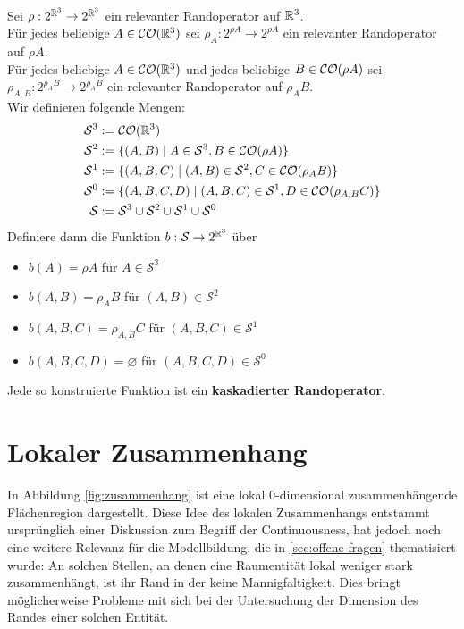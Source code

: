     \begin{dfn} \ \vspace{8pt}

        \noindent
        Sei $\rho: 2^{\mathbb{R}^3} \to 2^{\mathbb{R}^3}$ ein relevanter Randoperator auf $\mathbb{R}^3$.\\
        Für jedes beliebige $A \in \mathcal{CO}(\mathbb{R}^3)$ sei $\rho_A : 2^{\rho A} \to 2^{\rho A}$ ein relevanter Randoperator auf $\rho A$.\\
        Für jedes beliebige $A \in \mathcal{CO}(\mathbb{R}^3)$ und jedes beliebige $B \in \mathcal{CO}(\rho A)$ sei $\rho_{A,B} : 2^{\rho_A B} \to 2^{\rho_A B}$ ein relevanter Randoperator auf $\rho_A B$.\\
        Wir definieren folgende Mengen:
        \begin{align*}
            \mathcal{S}^3 &:= \mathcal{CO}(\mathbb{R}^3) \\
            \mathcal{S}^2 &:= \{(A,B) \mid A \in \mathcal{S}^3, B \in \mathcal{CO}(\rho A)\} \\
            \mathcal{S}^1 &:= \{(A,B,C) \mid (A,B) \in \mathcal{S}^2, C \in \mathcal{CO}(\rho_A B)\} \\
            \mathcal{S}^0 &:= \{(A,B,C,D) \mid (A,B,C) \in \mathcal{S}^1, D \in \mathcal{CO}(\rho_{A,B} C)\}\\
            \mathcal{S} &:= \mathcal{S}^3 \cup \mathcal{S}^2 \cup \mathcal{S}^1 \cup \mathcal{S}^0
        \end{align*}
        Definiere dann die Funktion $b : \mathcal{S} \to 2^{\mathbb{R}^3}$ über
        \begin{itemize}
            \item $b(A) = \rho A$ für $A \in \mathcal{S}^3$
            \item $b(A,B) = \rho_A B$ für $(A,B) \in \mathcal{S}^2$
            \item $b(A,B,C) = \rho_{A,B} C$ für $(A,B,C) \in \mathcal{S}^1$
            \item $b(A,B,C,D) = \varnothing$ für $(A,B,C,D) \in \mathcal{S}^0$
        \end{itemize}
        Jede so konstruierte Funktion ist ein \textbf{kaskadierter Randoperator}.
    \end{dfn}
    

\section{Lokaler Zusammenhang}\label{sec:lok-zusammenhang}

    In Abbildung \ref{fig:zusammenhang} ist 
    eine lokal $0$-dimensional zusammenhängende Flächenregion dargestellt.
    Diese Idee des lokalen Zusammenhangs entstammt ursprünglich einer Diskussion zum Begriff der Continuousness, hat jedoch noch eine weitere Relevanz für die Modellbildung, die in \ref{sec:offene-fragen} thematisiert wurde:
    An solchen Stellen, an denen eine Raumentität lokal weniger stark zusammenhängt, ist ihr Rand in der \strukt keine Mannigfaltigkeit.
    Dies bringt möglicherweise Probleme mit sich bei der Untersuchung der Dimension des Randes einer solchen Entität.

